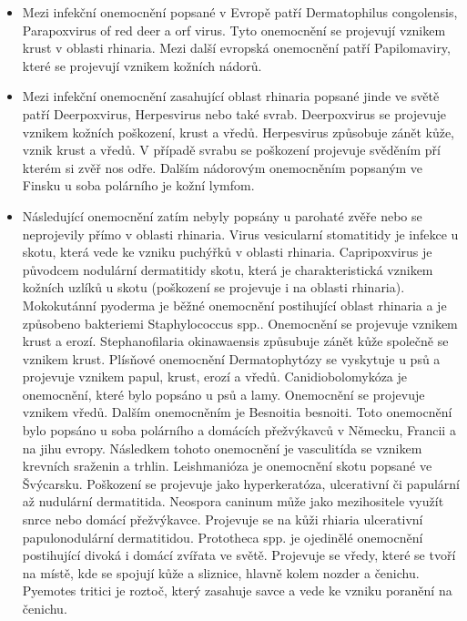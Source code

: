 \begin{itemize}
    \item Mezi infekční onemocnění popsané v Evropě patří Dermatophilus congolensis, Parapoxvirus of red deer a orf virus. Tyto onemocnění se projevují vznikem krust v oblasti rhinaria. Mezi další evropská onemocnění patří Papilomaviry, které se projevují vznikem kožních nádorů.
    
    \item Mezi infekční onemocnění zasahující oblast rhinaria popsané jinde ve světě patří Deerpoxvirus, Herpesvirus nebo také svrab. Deerpoxvirus se projevuje vznikem kožních poškození, krust a vředů. Herpesvirus způsobuje zánět kůže, vznik krust a vředů. V případě svrabu se poškození projevuje svěděním pří kterém si zvěř nos odře. Dalším nádorovým onemocněním popsaným ve Finsku u soba polárního je kožní lymfom.

    \item Následující onemocnění zatím nebyly popsány u parohaté zvěře nebo se neprojevily přímo v oblasti rhinaria. Virus vesicularní stomatitidy je infekce u skotu, která vede ke vzniku puchýřků v oblasti rhinaria. Capripoxvirus je původcem nodulární dermatitidy skotu, která je charakteristická vznikem kožních uzlíků u skotu (poškození se projevuje i na oblasti rhinaria). Mokokutánní pyoderma je běžné onemocnění postihující oblast rhinaria a je způsobeno bakteriemi Staphylococcus spp.. Onemocnění se projevuje vznikem krust a erozí.  Stephanofilaria okinawaensis způsubuje zánět kůže společně se vznikem krust. Plísňové onemocnění Dermatophytózy se vyskytuje u psů a projevuje vznikem papul, krust, erozí a vředů. Canidiobolomykóza je onemocnění, které bylo popsáno u psů a lamy. Onemocnění se projevuje vznikem vředů. Dalším onemocněním je Besnoitia besnoiti. Toto onemocnění bylo popsáno u soba polárního a domácích přežvýkavců v Německu, Francii a na jihu evropy. Následkem tohoto onemocnění je vasculitída se vznikem krevních sraženin a trhlin. Leishmanióza je onemocnění skotu popsané ve Švýcarsku. Poškození se projevuje jako hyperkeratóza, ulcerativní či papulární až nudulární dermatitida. Neospora caninum může jako mezihositele využít snrce nebo domácí přežvýkavce. Projevuje se na kůži rhiaria ulcerativní papulonodulární dermatitidou. Prototheca spp. je ojedinělé onemocnění postihující divoká i domácí zvířata ve světě. Projevuje se vředy, které se tvoří na místě, kde se spojují kůže a sliznice, hlavně kolem nozder a čenichu. Pyemotes tritici je roztoč, který zasahuje savce a vede ke vzniku poranění na čenichu.


\end{itemize}
